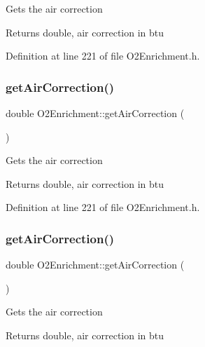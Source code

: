 Gets the air correction \begin{DoxyReturn}{Returns}
double, air correction in btu 
\end{DoxyReturn}


Definition at line 221 of file O2\+Enrichment.\+h.

\mbox{\label{class_o2_enrichment_a95f854d807f2b33ca32c68707e627283}} 
\subsubsection{\texorpdfstring{get\+Air\+Correction()}{getAirCorrection()}\hspace{0.1cm}{\footnotesize\ttfamily [2/3]}}
{\footnotesize\ttfamily double O2\+Enrichment\+::get\+Air\+Correction (\begin{DoxyParamCaption}{ }\end{DoxyParamCaption})\hspace{0.3cm}{\ttfamily [inline]}}

Gets the air correction \begin{DoxyReturn}{Returns}
double, air correction in btu 
\end{DoxyReturn}


Definition at line 221 of file O2\+Enrichment.\+h.

\mbox{\label{class_o2_enrichment_a95f854d807f2b33ca32c68707e627283}} 
\subsubsection{\texorpdfstring{get\+Air\+Correction()}{getAirCorrection()}\hspace{0.1cm}{\footnotesize\ttfamily [3/3]}}
{\footnotesize\ttfamily double O2\+Enrichment\+::get\+Air\+Correction (\begin{DoxyParamCaption}{ }\end{DoxyParamCaption})\hspace{0.3cm}{\ttfamily [inline]}}

Gets the air correction \begin{DoxyReturn}{Returns}
double, air correction in btu 
\end{DoxyReturn}


